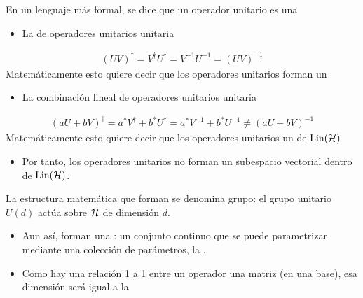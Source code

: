 \documentclass[letterpaper,10pt,english]{jupyterBook}
\newcommand{\Hil}{{\cal H}}
\newcommand{\Lin}{\hbox{Lin}}
\begin{document}
\sphinxAtStartPar
En un lenguaje más formal, se dice que un operador unitario es una 
\begin{itemize}
\item {} 
\sphinxAtStartPar
La  de  operadores unitarios   unitaria

\end{itemize}
\begin{equation*}
\begin{split}
(UV)^\dagger = V^\dagger U^\dagger = V^{-1}U^{-1} = (UV)^{-1} 
\end{split}
\end{equation*}
\sphinxAtStartPar
Matemáticamente esto quiere decir que los operadores unitarios forman un 
\begin{itemize}
\item {} 
\sphinxAtStartPar
La combinación lineal de operadores unitarios  unitaria

\end{itemize}
\begin{equation*}
\begin{split}
 (a U+ bV)^\dagger = a^* V^\dagger+ b^* U^\dagger = a^* V^{-1}+ b^* U^{-1} \neq  (a U+ b V)^{-1}
\end{split}
\end{equation*}
\sphinxAtStartPar
Matemáticamente esto quiere decir que los operadores unitarios  un  de \(\Lin(\Hil)\)
\begin{itemize}
\item {} 
\sphinxAtStartPar
Por tanto, los operadores unitarios no forman un subespacio vectorial dentro de \(\Lin(\Hil)\).

\end{itemize}

\sphinxAtStartPar
La estructura matemática que forman se denomina grupo: el grupo unitario \(U(d)\) actúa sobre \(\Hil\) de dimensión \(d\).
\begin{itemize}
\item {} 
\sphinxAtStartPar
Aun así, forman una : un conjunto continuo  que se puede parametrizar mediante una colección de parámetros, la .

\end{itemize}
\begin{itemize}
\item {} 
\sphinxAtStartPar
Como hay una relación 1 a 1 entre un operador una matriz (en una base), esa dimensión será igual a la 

\end{itemize}
\end{document}
